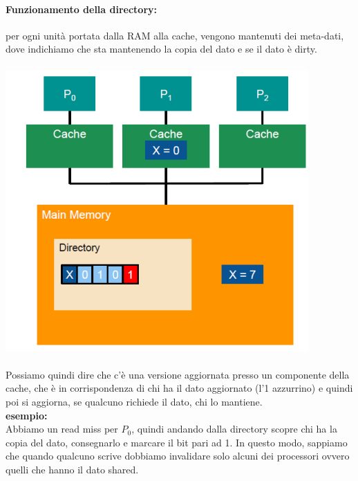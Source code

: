 \documentclass[12pt, oneside]{extbook}
\begin{document}
\paragraph{Funzionamento della directory:}per ogni unità portata dalla RAM alla cache, vengono mantenuti dei meta-dati, dove indichiamo che sta mantenendo la copia del dato e se il dato è dirty.\\\\
\includegraphics[scale=0.5]{immagini/dir_based}\\\\
Possiamo quindi dire che c'è una versione aggiornata presso un componente della cache, che è in corrispondenza di chi ha il dato aggiornato (l'1 azzurrino) e quindi poi si aggiorna, se qualcuno richiede il dato, chi lo mantiene.\\ \textbf{esempio:}\\ Abbiamo un read miss per $P_0$, quindi andando dalla directory scopre chi ha la copia del dato, consegnarlo e marcare il bit pari ad 1. In questo modo, sappiamo che quando qualcuno scrive dobbiamo invalidare solo alcuni dei processori ovvero quelli che hanno il dato shared.
\end{document}
